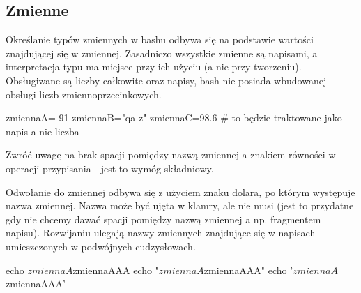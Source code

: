 % 
% 
% 
% 


\subsection{Zmienne}

Określanie typów zmiennych w bashu odbywa się na podstawie wartości znajdującej się w zmiennej.
Zasadniczo wszystkie zmienne są napisami, a interpretacja typu ma miejsce przy ich użyciu (a nie przy tworzeniu).
Obsługiwane są liczby całkowite oraz napisy, bash nie posiada wbudowanej obsługi liczb zmiennoprzecinkowych.

\begin{CodeFrame*}[bash]{}
zmiennaA=-91
zmiennaB="qa z"
zmiennaC=98.6 # to będzie traktowane jako napis a nie liczba
\end{CodeFrame*}
Zwróć uwagę na brak spacji pomiędzy nazwą zmiennej a znakiem równości w operacji przypisania - jest to wymóg składniowy.

Odwołanie do zmiennej odbywa się z użyciem znaku dolara, po którym występuje nazwa zmiennej. Nazwa może być ujęta w klamry, ale nie musi (jest to przydatne gdy nie chcemy dawać spacji pomiędzy nazwą zmiennej a np. fragmentem napisu). Rozwijaniu ulegają nazwy zmiennych znajdujące się w napisach umieszczonych w podwójnych cudzysłowach.
\begin{CodeFrame*}[bash]{}
echo  $zmiennaA ${zmiennaA}AA
echo "$zmiennaA ${zmiennaA}AA"
echo '$zmiennaA ${zmiennaA}AA'
\end{CodeFrame*}

